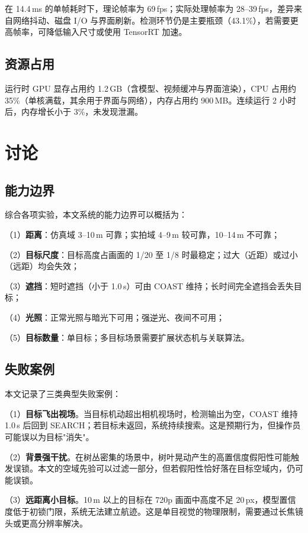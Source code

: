在 14.4\,ms 的单帧耗时下，理论帧率为 69\,fps；实际处理帧率为 28--39\,fps，差异来自网络抖动、磁盘 I/O 与界面刷新。检测环节仍是主要瓶颈（43.1\%），若需要更高帧率，可降低输入尺寸或使用 TensorRT 加速。

\subsection{资源占用}

运行时 GPU 显存占用约 1.2\,GB（含模型、视频缓冲与界面渲染），CPU 占用约 35\%（单核满载，其余用于界面与网络），内存占用约 900\,MB。连续运行 2 小时后，内存增长小于 3\%，未发现泄漏。

\section{讨论}

\subsection{能力边界}

综合各项实验，本文系统的能力边界可以概括为：

（1）\textbf{距离}：仿真域 3--10\,m 可靠；实拍域 4--9\,m 较可靠，10--14\,m 不可靠；

（2）\textbf{目标尺度}：目标高度占画面的 1/20 至 1/8 时最稳定；过大（近距）或过小（远距）均会失效；

（3）\textbf{遮挡}：短时遮挡（小于 1.0\,s）可由 COAST 维持；长时间完全遮挡会丢失目标；

（4）\textbf{光照}：正常光照与暗光下可用；强逆光、夜间不可用；

（5）\textbf{目标数量}：单目标；多目标场景需要扩展状态机与关联算法。

\subsection{失败案例}

本文记录了三类典型失败案例：

（1）\textbf{目标飞出视场}。当目标机动超出相机视场时，检测输出为空，COAST 维持 1.0\,s 后回到 SEARCH；若目标未返回，系统持续搜索。这是预期行为，但操作员可能误以为目标"消失"。

（2）\textbf{背景强干扰}。在树丛密集的场景中，树叶晃动产生的高置信度假阳性可能触发误锁。本文的空域先验可以过滤一部分，但若假阳性恰好落在目标空域内，仍可能误锁。

（3）\textbf{远距离小目标}。10\,m 以上的目标在 720p 画面中高度不足 20\,px，模型置信度低于初锁门限，系统无法建立航迹。这是单目视觉的物理限制，需要通过长焦镜头或更高分辨率解决。

